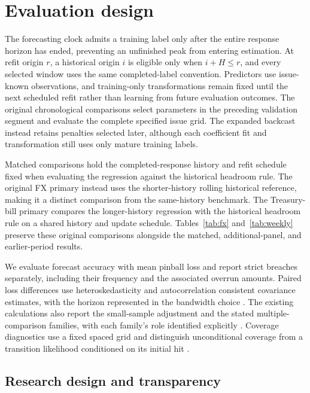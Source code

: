 \documentclass[11pt,a4paper]{article}
\begin{document}
\FloatBarrier

\section{Evaluation design}\label{sec:evaluation}

The forecasting clock admits a training label only after the entire response horizon has ended, preventing an unfinished peak from entering estimation. At refit origin \(r\), a historical origin \(i\) is eligible only when \(i+H\le r\), and every selected window uses the same completed-label convention. Predictors use issue-known observations, and training-only transformations remain fixed until the next scheduled refit rather than learning from future evaluation outcomes. The original chronological comparisons select parameters in the preceding validation segment and evaluate the complete specified issue grid. The expanded backcast instead retains penalties selected later, although each coefficient fit and transformation still uses only mature training labels.


Matched comparisons hold the completed-response history and refit schedule fixed when evaluating the regression against the historical headroom rule. The original FX primary instead uses the shorter-history rolling historical reference, making it a distinct comparison from the same-history benchmark. The Treasury-bill primary compares the longer-history regression with the historical headroom rule on a shared history and update schedule. Tables~\ref{tab:fx} and~\ref{tab:weekly} preserve these original comparisons alongside the matched, additional-panel, and earlier-period results.


We evaluate forecast accuracy with mean pinball loss and report strict breaches separately, including their frequency and the associated overrun amounts. Paired loss differences use heteroskedasticity and autocorrelation consistent covariance estimates, with the horizon represented in the bandwidth choice \citep{dm1995,nw1987}. The existing calculations also report the small-sample adjustment and the stated multiple-comparison families, with each family's role identified explicitly \citep{hln1997,holm1979}. Coverage diagnostics use a fixed spaced grid and distinguish unconditional coverage from a transition likelihood conditioned on its initial hit \citep{kupiec1995,christ1998}.


\subsection{Research design and transparency}
\end{document}
